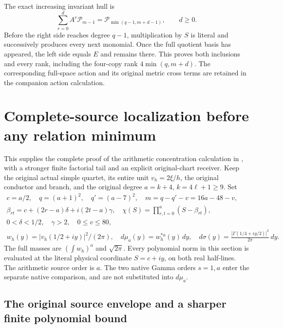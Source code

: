 \documentclass[11pt,a4paper]{article}
\begin{document}
The exact increasing invariant hull is
\[
 \sum_{r=0}^{d}A^r\mathcal P_{m-1}
      =\mathcal P_{\min(q-1,m+d-1)},\qquad d\ge0.
 \tag{COI17}
\]
Before the right side reaches degree $q-1$, multiplication by $S$
is literal and successively produces every next monomial. Once
the full quotient basis has appeared, the left side equals $E$
and remains there. This proves both inclusions and every rank,
including the four-copy rank $4\min(q,m+d)$.
The corresponding full-space action and its original metric cross
terms are retained in the companion action calculation.


\section{Complete-source localization before any relation minimum}

This supplies the complete proof of the arithmetic concentration
calculation in \cite{a03cm:program:arrival03-08}, with a stronger finite
factorial tail and an explicit original-chart receiver.
Keep the original actual simple quartet, its entire unit $v_h=2\xi/h$,
the original conductor and branch, and the original degree
$a=k+4$, $k=4\ell+1\ge9$. Set
\[
 \begin{gathered}
 c=a/2,\quad q=(a+1)^2,\quad q'=(a-7)^2,\quad
 m=q-q'-v=16a-48-v,\\
 \beta_{rt}=c+(2r-a)\delta+i(2t-a)\gamma,\quad
 \chi(S)=\prod_{r,t=0}^{a}(S-\beta_{rt}),\\
 0<\delta<1/2,\quad\gamma>2,\quad0\le v\le80,\\
 w_h(y)=|v_h(1/2+iy)|^2/(2\pi),\quad
 d\mu_a(y)=w_h^{*a}(y)\,dy,\quad
 d\sigma(y)=\frac{|\Gamma(1/4+iy/2)|^2}{2\pi}\,dy.
 \end{gathered}                                                   \tag{CAL1}
\]
The full masses are $(\int w_h)^a$ and $\sqrt{2\pi}$.
Every polynomial norm in this section is evaluated at the literal
physical coordinate $S=c+iy$, on both real half-lines. The arithmetic
source order is $a$. The two native Gamma orders $s=1,a$ enter the
separate native comparison, and are not substituted into $d\mu_a$.

\subsection{The original source envelope and a sharper finite polynomial bound}
\end{document}
